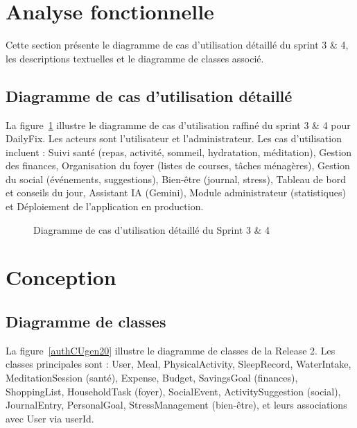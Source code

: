 \section{Analyse fonctionnelle}

Cette section présente le diagramme de cas d'utilisation détaillé du sprint 3 \& 4, les descriptions textuelles et le diagramme de classes associé.

\subsection{Diagramme de cas d'utilisation détaillé}

La figure~\ref{authCUgen} illustre le diagramme de cas d'utilisation raffiné du sprint 3 \& 4 pour DailyFix. Les acteurs sont l'utilisateur et l'administrateur. Les cas d'utilisation incluent : Suivi santé (repas, activité, sommeil, hydratation, méditation), Gestion des finances, Organisation du foyer (listes de courses, tâches ménagères), Gestion du social (événements, suggestions), Bien-être (journal, stress), Tableau de bord et conseils du jour, Assistant IA (Gemini), Module administrateur (statistiques) et Déploiement de l'application en production.

\begin{figure}[H]
\centering
\caption{Diagramme de cas d'utilisation détaillé du Sprint 3 \& 4}
\label{authCUgen}
\end{figure}

\section{Conception}

\subsection{Diagramme de classes}

La figure~\ref{authCUgen20} illustre le diagramme de classes de la Release 2. Les classes principales sont : User, Meal, PhysicalActivity, SleepRecord, WaterIntake, MeditationSession (santé), Expense, Budget, SavingsGoal (finances), ShoppingList, HouseholdTask (foyer), SocialEvent, ActivitySuggestion (social), JournalEntry, PersonalGoal, StressManagement (bien-être), et leurs associations avec User via userId.

